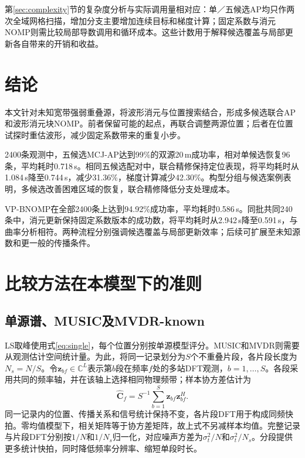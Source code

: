\documentclass[a4paper,fleqn]{cas-sc}
\numberwithin{equation}{section}
\numberwithin{figure}{section}
\numberwithin{table}{section}
\newcommand{\C}{\mathbb C}
\begin{document}
第\ref{sec:complexity}节的复杂度分析与实际调用量相对应：单／五候选AP均只作两次全域网格扫描，增加分支主要增加连续目标和梯度计算；固定系数与消元NOMP则需比较局部导数调用和循环成本。这些计数用于解释候选覆盖与局部更新各自带来的开销和收益。


\FloatBarrier

\section{结论}\label{sec:conclusion}
本文针对未知宽带强弱重叠源，将波形消元与位置搜索结合，形成多候选联合AP和波形消元块NOMP。前者保留可能的起点，再联合调整两源位置；后者在位置试探时重估波形，减少固定系数带来的重复小步。

2400条观测中，五候选MCJ-AP达到99\%的双源20\,m成功率，相对单候选恢复96条，平均耗时0.718\,s。相同五候选配对中，联合精修保持定位表现，将平均耗时从1.084\,s降至0.744\,s，减少31.36\%，梯度计算减少42.30\%。构型分组与候选案例表明，多候选改善困难区域的恢复，联合精修降低分支处理成本。

VP-BNOMP在全部2400条上达到94.92\%成功率，平均耗时0.586\,s。同批共同240条中，消元更新保持固定系数版本的成功数，将平均耗时从2.942\,s降至0.591\,s，与曲率分析相符。两种流程分别强调候选覆盖与局部更新效率；后续可扩展至未知源数和更一般的传播条件。


\FloatBarrier
\appendix

\section{比较方法在本模型下的准则}\label{app:baselines}
\subsection{单源谱、MUSIC及MVDR-known}
LS取峰使用式\eqref{eq:single}，每个位置分别按单源模型评分。MUSIC和MVDR则需要从观测估计空间统计量。为此，将同一记录划分为$S$个不重叠片段，各片段长度为$N_s=N/S$。令$\bm z_{bf}\in\C^L$表示第$b$段在频率$f$处的多站DFT观测，$b=1,\ldots,S$。各段采用共同的频率轴，并在该轴上选择相同物理频带；样本协方差估计为
\begin{equation}
 \widehat{\bm C}_f=S^{-1}\sum_{b=1}^S\bm z_{bf}\bm z_{bf}^H .
\end{equation}
同一记录内的位置、传播关系和信号统计保持不变，各片段DFT用于构成同频快拍。零均值模型下，相关矩阵等于协方差矩阵，故上式不另减样本均值。完整记录与片段DFT分别按$1/N$和$1/N_s$归一化，对应噪声方差为$\sigma_t^2/N$和$\sigma_t^2/N_s$。分段提供更多统计快拍，同时降低频率分辨率、缩短单段时长。
\end{document}
